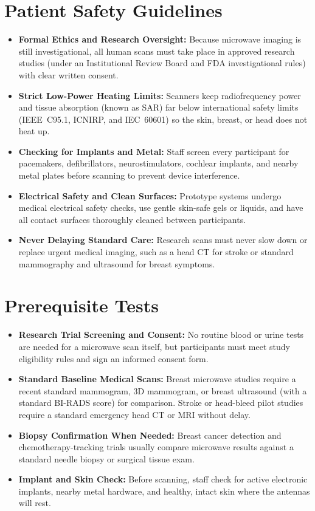 \section{Patient Safety Guidelines}
\begin{itemize}
  \item \textbf{Formal Ethics and Research Oversight:} Because microwave imaging is still investigational, all human scans must take place in approved research studies (under an Institutional Review Board and FDA investigational rules) with clear written consent.
  \item \textbf{Strict Low-Power Heating Limits:} Scanners keep radiofrequency power and tissue absorption (known as SAR) far below international safety limits (IEEE~C95.1, ICNIRP, and IEC~60601) so the skin, breast, or head does not heat up.
  \item \textbf{Checking for Implants and Metal:} Staff screen every participant for pacemakers, defibrillators, neurostimulators, cochlear implants, and nearby metal plates before scanning to prevent device interference.
  \item \textbf{Electrical Safety and Clean Surfaces:} Prototype systems undergo medical electrical safety checks, use gentle skin-safe gels or liquids, and have all contact surfaces thoroughly cleaned between participants.
  \item \textbf{Never Delaying Standard Care:} Research scans must never slow down or replace urgent medical imaging, such as a head CT for stroke or standard mammography and ultrasound for breast symptoms.
\end{itemize}

\section{Prerequisite Tests}
\begin{itemize}
  \item \textbf{Research Trial Screening and Consent:} No routine blood or urine tests are needed for a microwave scan itself, but participants must meet study eligibility rules and sign an informed consent form.
  \item \textbf{Standard Baseline Medical Scans:} Breast microwave studies require a recent standard mammogram, 3D mammogram, or breast ultrasound (with a standard BI-RADS score) for comparison. Stroke or head-bleed pilot studies require a standard emergency head CT or MRI without delay.
  \item \textbf{Biopsy Confirmation When Needed:} Breast cancer detection and chemotherapy-tracking trials usually compare microwave results against a standard needle biopsy or surgical tissue exam.
  \item \textbf{Implant and Skin Check:} Before scanning, staff check for active electronic implants, nearby metal hardware, and healthy, intact skin where the antennas will rest.
\end{itemize}

